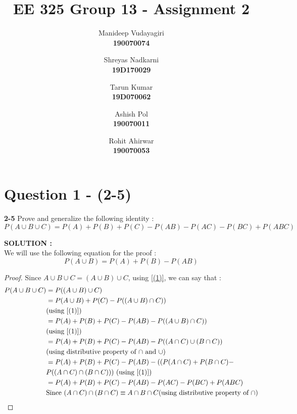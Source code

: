 \documentclass{article}
\begin{document}
\title{EE 325 Group 13 - Assignment 2 }
\author{
	Manideep Vudayagiri\\
	\textbf{190070074}
	\and
	Shreyas Nadkarni\\
	\textbf{19D170029}
	\and
	Tarun Kumar\\
	\textbf{19D070062}
	\and
	Ashish Pol\\
	\textbf{190070011}
	\and
	Rohit Ahirwar\\
	\textbf{190070053}
	
	
}

\maketitle
\tableofcontents
\thispagestyle{empty}
\clearpage
{}

\newpage

\section{Question 1 - (2-5)}
\label{Q1}
\textbf{2-5} Prove and generalize the following identity : \\
\begin{equation*}
	P(A \cup B \cup C) = P(A) + P(B) + P(C) - P(AB) - P(AC) - P(BC) + P(ABC)
\end{equation*}

\hspace{1em} \large{\textbf{SOLUTION :}} \\
We will use the following equation for the proof :
\begin{equation}
\label{(1)}
	P(A \cup B ) = P(A) + P(B) - P(AB)
\end{equation}
\begin{proof}
	Since $A \cup B \cup C = (A \cup B) \cup C$,  using \ref{(1)}, we can say that : \\ 
	\begin{align*}
	    P(A \cup B \cup C) &=P((A \cup B) \cup C) \\
	    &= P(A \cup B) + P(C) - P((A \cup B) \cap C)) \\ &\text{(using \ref{(1)})} \\
	    &= P(A) + P(B) + P(C) - P(AB) - P((A \cup B) \cap C)) \\ &\text{(using \ref{(1)})} \\
	    &= P(A) + P(B) + P(C) - P(AB) - P((A \cap C) \cup (B \cap C)) \\ &\text{(using distributive property of $\cap$ and $\cup$)} \\
	    &= P(A) + P(B) + P(C) - P(AB) - ((P(A \cap C) + P(B \cap C) - \\ &P((A \cap C) \cap (B \cap C))) \text{  (using \ref{(1)})} \\
	    &= P(A) + P(B) + P(C) - P(AB) - P(AC) - P(BC) + P(ABC) \\
	    & \text{Since }  (A \cap C) \cap (B \cap C) \equiv A \cap B \cap C  \text{(using distributive property of $\cap$)} 	
	 \end{align*}
\end{proof}
\end{document}

